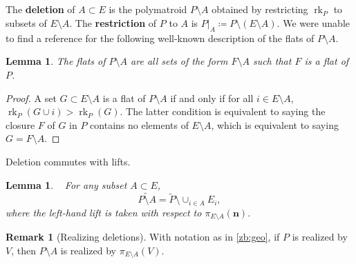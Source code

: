 \documentclass[11pt]{article}
\newtheorem{lemm}[theo]{Lemma}
\theoremstyle{definition}
\newtheorem{rema}[theo]{Remark}
\numberwithin{equation}{section}
\DeclareMathOperator{\rk}{rk}
\newcommand{\word}[1]{\textbf{#1}}
\begin{document}
\subsection{}\label{operations}
The \word{deletion} of $A \subset E$ is the polymatroid $P \setminus A$ obtained by restricting $\rk_P$ to subsets of $E \setminus A$.
The \word{restriction} of $P$ to $A$ is $P|_A \coloneqq  P \setminus (E \setminus A)$.
We were unable to find a reference for the following well-known description of the flats of $P \setminus A$.
\begin{lemm}\label{deletionflats}
  The flats of $P \setminus A$ are all sets of the form $F \setminus A$ such that $F$ is a flat of $P$.
\end{lemm}
\begin{proof}
    A set $G \subset E\setminus A$ is a flat of $P \setminus A$ if and only if for all $i \in E \setminus A$, $\rk_P(G \cup i) > \rk_P(G)$.
  The latter condition is equivalent to saying the closure $F$ of $G$ in $P$ contains no elements of $E \setminus A$, which is equivalent to saying $G = F \setminus A$.
\end{proof}
 Deletion commutes with lifts.
\begin{lemm}\label{deletioncommutes}~\cite[Lemma 2.14{\footnotemark[\value{footnote}]{}}]{CHLSW22}
 For any subset $A\subset E$, 
 \[
 \widetilde{P \setminus A} = \widetilde P \setminus \cup_{i \in A} E_i,
 \]
where the left-hand lift is taken with respect to $\pi_{E \setminus A}(\mathbf n)$.
\end{lemm}
\begin{rema}[Realizing deletions]
  With notation as in \cref{zb:geo}, if $P$ is realized by $V$, then $P \setminus A$ is realized by $\pi_{E \setminus A}(V)$.
\end{rema}
\end{document}
